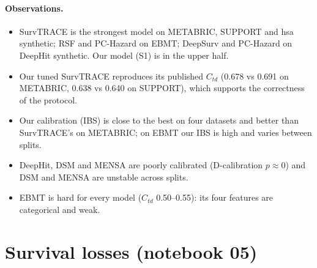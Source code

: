 \documentclass[11pt]{article}
\newcommand{\tab}[1]{\resizebox{\textwidth}{!}{}}
\begin{document}
\paragraph{Observations.}
\begin{itemize}
  \item SurvTRACE is the strongest model on METABRIC, SUPPORT and hsa synthetic; RSF and PC-Hazard on
        EBMT; DeepSurv and PC-Hazard on DeepHit synthetic. Our model (S1) is in the upper half.
  \item Our tuned SurvTRACE reproduces its published $C_{td}$ (0.678 vs 0.691 on METABRIC, 0.638 vs
        0.640 on SUPPORT), which supports the correctness of the protocol.
  \item Our calibration (IBS) is close to the best on four datasets and better than SurvTRACE's on
        METABRIC; on EBMT our IBS is high and varies between splits.
  \item DeepHit, DSM and MENSA are poorly calibrated (D-calibration $p\approx0$) and DSM and MENSA are
        unstable across splits.
  \item EBMT is hard for every model ($C_{td}$ 0.50--0.55): its four features are categorical and weak.
\end{itemize}

\section{Survival losses (notebook 05)}\label{sec:loss}

\begin{table}[H]
\centering
\caption{$C_{td}$ of each loss recipe.}
\tab{loss_ctd}
\end{table}

\begin{table}[H]
\centering
\caption{Integrated Brier score of each loss recipe.}
\tab{loss_ibs}
\end{table}

\begin{table}[H]
\centering
\caption{Brier score at the 25/50/75\% time points.}
\tab{loss_brier}
\end{table}

\begin{table}[H]
\centering
\caption{Cumulative/dynamic AUC.}
\tab{loss_auc}
\end{table}

\begin{table}[H]
\centering
\caption{Each recipe against S1 on the same 10 splits: mean difference, number of splits where the
recipe's value is higher, and paired $p$-values.}
\tab{loss_tests}
\end{table}
\end{document}
